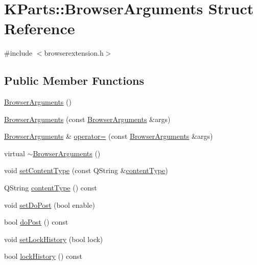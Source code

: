 \hypertarget{structKParts_1_1BrowserArguments}{\section{K\+Parts\+:\+:Browser\+Arguments Struct Reference}
\label{structKParts_1_1BrowserArguments}
}


{\ttfamily \#include $<$browserextension.\+h$>$}

\subsection*{Public Member Functions}
\begin{DoxyCompactItemize}
\item 
\hyperlink{structKParts_1_1BrowserArguments_a87b08664fe9d6dc90631f4a7c0d4a871}{Browser\+Arguments} ()
\item 
\hyperlink{structKParts_1_1BrowserArguments_a1a9790044d682d0346c03f9468d31aa5}{Browser\+Arguments} (const \hyperlink{structKParts_1_1BrowserArguments}{Browser\+Arguments} \&args)
\item 
\hyperlink{structKParts_1_1BrowserArguments}{Browser\+Arguments} \& \hyperlink{structKParts_1_1BrowserArguments_acd0d51024957675a322c5120ab8a9b89}{operator=} (const \hyperlink{structKParts_1_1BrowserArguments}{Browser\+Arguments} \&args)
\item 
virtual \hyperlink{structKParts_1_1BrowserArguments_a1f558d1e3fc7441f86346e82f4e6fcaf}{$\sim$\+Browser\+Arguments} ()
\item 
void \hyperlink{structKParts_1_1BrowserArguments_aa2a3384e7711f1a6fc6b710852d11bc4}{set\+Content\+Type} (const Q\+String \&\hyperlink{structKParts_1_1BrowserArguments_a11198af20bc7c8b9f5c165ed0ba1401b}{content\+Type})
\item 
Q\+String \hyperlink{structKParts_1_1BrowserArguments_a11198af20bc7c8b9f5c165ed0ba1401b}{content\+Type} () const 
\item 
void \hyperlink{structKParts_1_1BrowserArguments_a7c934a91eddfd3ddfb9e1fe0f4eace9f}{set\+Do\+Post} (bool enable)
\item 
bool \hyperlink{structKParts_1_1BrowserArguments_a8470520e769024497a32293e36bdd92f}{do\+Post} () const 
\item 
void \hyperlink{structKParts_1_1BrowserArguments_ad4ad5d94380a0548c5d3e53368f6f1f5}{set\+Lock\+History} (bool lock)
\item 
bool \hyperlink{structKParts_1_1BrowserArguments_a5292374726fba2faee5f9b44acd67c70}{lock\+History} () const 

\end{DoxyCompactItemize}
